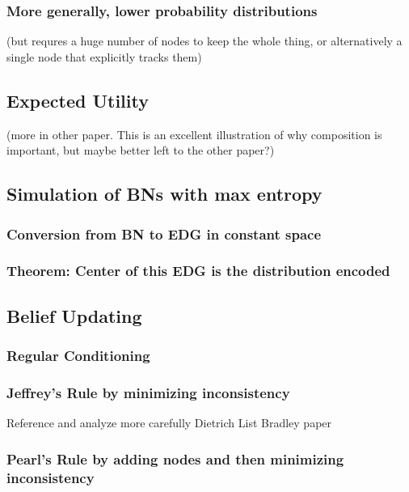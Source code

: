 \documentclass[11pt]{article}
\begin{document}
\subsubsection{More generally, lower probability distributions}
\label{sec:orgbabe319}
(but requres a huge number of nodes to keep the whole thing, or alternatively a single node that explicitly tracks them)

\subsection{Expected Utility}
\label{sec:org46ae7cb}
(more in other paper. This is an excellent illustration of why composition is important, but maybe better left to the other paper?)

\subsection{Simulation of BNs with max entropy}
\label{sec:org08ab9ef}
\subsubsection{Conversion from BN to EDG in constant space}
\label{sec:org5c2e7da}
\subsubsection{Theorem: Center of this EDG is the distribution encoded}
\label{sec:org6c9d1d4}

\subsection{Belief Updating}
\label{sec:org1db0534}
\subsubsection{Regular Conditioning}
\label{sec:org698f068}
\subsubsection{Jeffrey's Rule by minimizing inconsistency}
\label{sec:org0fa57a0}
Reference and analyze more carefully Dietrich List Bradley paper
\subsubsection{Pearl's Rule by adding nodes and then minimizing inconsistency}
\label{sec:orgf68dfca}
\end{document}
